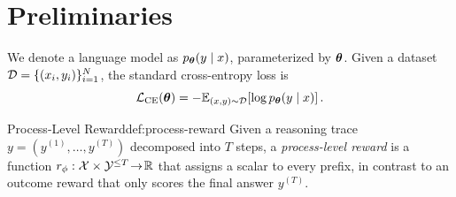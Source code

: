 \section{Preliminaries}
\label{sec:prelim}

We denote a language model as $p_{\bm{\theta}}(y \mid x)$, parameterized by
$\bm{\theta}$. Given a dataset $\mathcal{D} = \{(x_i, y_i)\}_{i=1}^{N}$, the standard
cross-entropy loss is
\begin{equation}
    \mathcal{L}_{\mathrm{CE}}(\bm{\theta})
      = -\mathbb{E}_{(x,y)\sim\mathcal{D}}\!\left[\log p_{\bm{\theta}}(y\mid x)\right].
    \label{eq:ce}
\end{equation}

\begin{definition}{Process-Level Reward}{def:process-reward}
Given a reasoning trace $y = (y^{(1)},\dots,y^{(T)})$ decomposed into $T$
steps, a \emph{process-level reward} is a function
$r_\phi : \mathcal{X}\times\mathcal{Y}^{\leq T}\!\rightarrow\!\mathbb{R}$ that assigns
a scalar to every prefix, in contrast to an outcome reward that only scores
the final answer $y^{(T)}$.
\end{definition}
